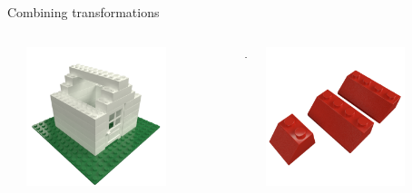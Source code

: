 \begin{frame}{Combining transformations}
    \begin{columns}[c]
        \begin{column}{0.05\textwidth}
        \end{column}\begin{column}{0.3\textwidth}
            \centering
            \includegraphics[width=0.7\textwidth]{images/03_transformation_framework/lego_house_roofless.png}
        \end{column}\begin{column}{0.05\textwidth}
            \centering
            +
        \end{column}\begin{column}{0.2\textwidth}
            \centering
            \includegraphics[width=0.7\textwidth]{images/03_transformation_framework/lego_roof_pieces.png}

\end{column}
\end{columns}
\end{frame}
